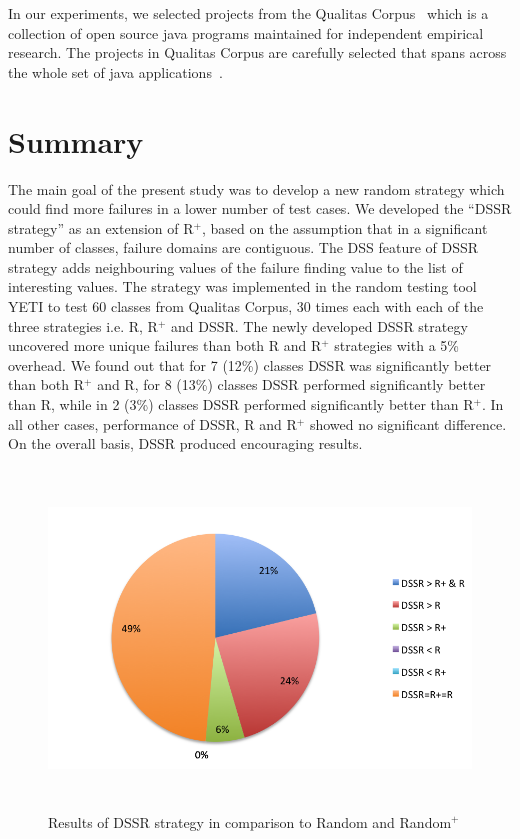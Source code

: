 In our experiments, we selected projects from the Qualitas Corpus~\cite{tempero2010qualitas} which is a collection of open source java programs maintained for independent empirical research. The projects in Qualitas Corpus are carefully selected that spans across the whole set of java applications~\cite{oriol2012random, tempero2010empirical, tempero2008empirical}.




\section{Summary}\label{sec:conc}
The main goal of the present study was to develop a new random strategy which could find more failures in a lower number of test cases. We developed the ``DSSR strategy'' as an extension of R$^+$, based on the assumption that in a significant number of classes, failure domains are contiguous. The DSS feature of DSSR strategy adds neighbouring values of the failure finding value to the list of interesting values. The strategy was implemented in the random testing tool YETI to test 60 classes from Qualitas Corpus, 30 times each with each of the three strategies i.e. R, R$^+$ and DSSR. The newly developed DSSR strategy uncovered more unique failures than both R and R$^+$ strategies with a 5\% overhead. We found out that for 7 (12\%) classes DSSR was significantly better than both R$^+$ and R, for 8 (13\%) classes DSSR performed significantly better than R, while in 2 (3\%) classes DSSR performed significantly better than R$^+$. In all other cases, performance of DSSR, R and R$^+$ showed no significant difference. On the overall basis, DSSR produced encouraging results. 

\begin{figure}[h]
\centering
\includegraphics[width=14cm,height=9cm]{chapter4/resultsOfDSSRPie.png}
\caption{Results of DSSR strategy in comparison to Random and Random$^+$}
\label{fig:resultsOfDSSRPie}
\end{figure}



